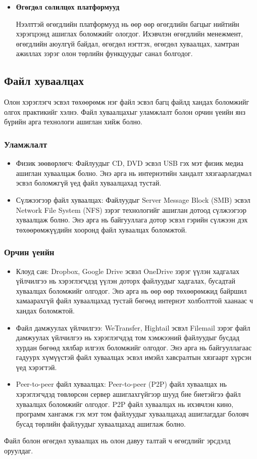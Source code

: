 \begin{itemize}
    \item \textbf{Өгөгдөл солилцох платформууд}

          Нээлттэй өгөгдлийн платформууд нь өөр өөр өгөгдлийн багцыг нийтийн хэрэгцээнд ашиглах боломжийг ологдог. Ихэвчлэн өгөгдлийн менежмент, өгөгдлийн аюулгүй байдал, өгөгдөл нэгтгэх, өгөгдөл хуваалцах, хамтран ажиллах зэрэг олон төрлийн функцуудыг санал болгодог.

\end{itemize}

\subsection*{Файл хуваалцах}
Олон хэрэглэгч эсвэл төхөөрөмж нэг файл эсвэл багц файлд хандах боломжийг олгох практикийг хэлнэ. Файл хуваалцахыг уламжлалт болон орчин үеийн янз бүрийн арга технологи ашиглан хийж болно.

\subsubsection*{Уламжлалт}
\begin{itemize}
    \item Физик зөөвөрлөгч: Файлуудыг CD, DVD эсвэл USB гэх мэт физик медиа ашиглан хуваалцаж болно. Энэ арга нь интернэтийн хандалт хязгаарлагдмал эсвэл боломжгүй үед файл хуваалцахад тустай.
    \item Сүлжээгээр файл хуваалцах: Файлуудыг Server Message Block (SMB) эсвэл Network File System (NFS) зэрэг технологийг ашиглан дотоод сүлжээгээр хуваалцаж болно. Энэ арга нь байгууллага дотор эсвэл гэрийн сүлжээн дэх төхөөрөмжүүдийн хооронд файл хуваалцах боломжтой.
\end{itemize}

\subsubsection*{Орчин үеийн}
\begin{itemize}
    \item Клоуд сан: Dropbox, Google Drive эсвэл OneDrive зэрэг үүлэн хадгалах үйлчилгээ нь хэрэглэгчдэд үүлэн доторх файлуудыг хадгалах, бусадтай хуваалцах боломжийг олгодог. Энэ арга нь өөр өөр төхөөрөмжид байршил хамаарахгүй файл хуваалцахад тустай бөгөөд интернэт холболттой хаанаас ч хандах боломжтой.
    \item Файл дамжуулах үйлчилгээ: WeTransfer, Hightail эсвэл Filemail зэрэг файл дамжуулах үйлчилгээ нь хэрэглэгчдэд том хэмжээний файлуудыг бусдад хурдан бөгөөд хялбар илгээх боломжийг олгодог. Энэ арга нь байгууллагаас гадуурх хүмүүстэй файл хуваалцах эсвэл имэйл хавсралтын хязгаарт хүрсэн үед хэрэгтэй.
    \item Peer-to-peer файл хуваалцах: Peer-to-peer (P2P) файл хуваалцах нь хэрэглэгчдэд төвлөрсөн сервер ашиглахгүйгээр шууд бие биетэйгээ файл хуваалцах боломжийг олгодог. P2P файл хуваалцах нь ихэвчлэн кино, программ хангамж гэх мэт том файлуудыг хуваалцахад ашиглагддаг боловч бусад төрлийн файлуудыг хуваалцахад ашиглаж болно.
\end{itemize}
Файл болон өгөгдөл хуваалцах нь олон давуу талтай ч өгөгдлийг эрсдэлд оруулдаг.

